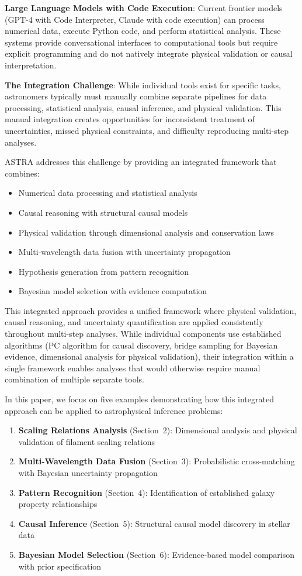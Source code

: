 \documentclass[usenatbib]{rasti}
\begin{document}
\textbf{Large Language Models with Code Execution}: Current frontier models (GPT-4 with Code Interpreter, Claude with code execution) can process numerical data, execute Python code, and perform statistical analysis. These systems provide conversational interfaces to computational tools but require explicit programming and do not natively integrate physical validation or causal interpretation.

\textbf{The Integration Challenge}: While individual tools exist for specific tasks, astronomers typically must manually combine separate pipelines for data processing, statistical analysis, causal inference, and physical validation. This manual integration creates opportunities for inconsistent treatment of uncertainties, missed physical constraints, and difficulty reproducing multi-step analyses.

ASTRA addresses this challenge by providing an integrated framework that combines:
\begin{itemize}
\item Numerical data processing and statistical analysis
\item Causal reasoning with structural causal models
\item Physical validation through dimensional analysis and conservation laws
\item Multi-wavelength data fusion with uncertainty propagation
\item Hypothesis generation from pattern recognition
\item Bayesian model selection with evidence computation
\end{itemize}

This integrated approach provides a unified framework where physical validation, causal reasoning, and uncertainty quantification are applied consistently throughout multi-step analyses. While individual components use established algorithms (PC algorithm for causal discovery, bridge sampling for Bayesian evidence, dimensional analysis for physical validation), their integration within a single framework enables analyses that would otherwise require manual combination of multiple separate tools.

In this paper, we focus on five examples demonstrating how this integrated approach can be applied to astrophysical inference problems:
\begin{enumerate}
\item \textbf{Scaling Relations Analysis} (Section~2): Dimensional analysis and physical validation of filament scaling relations
\item \textbf{Multi-Wavelength Data Fusion} (Section~3): Probabilistic cross-matching with Bayesian uncertainty propagation
\item \textbf{Pattern Recognition} (Section~4): Identification of established galaxy property relationships
\item \textbf{Causal Inference} (Section~5): Structural causal model discovery in stellar data
\item \textbf{Bayesian Model Selection} (Section~6): Evidence-based model comparison with prior specification
\end{enumerate}
\end{document}
